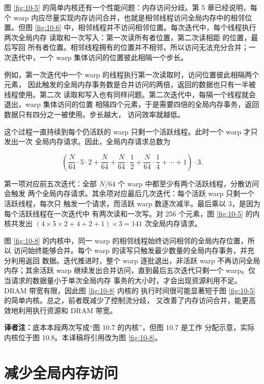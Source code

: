 图 \ref{fig:10-5} 的简单内核还有一个性能问题：内存访问分歧。第 5 章已经说明，每个
warp 内应尽量实现内存访问合并，也就是相邻线程访问全局内存中的相邻位置。但图
\ref{fig:10-6} 中，相邻线程并不访问相邻位置。每次迭代中，每个线程执行两次全局内存
读取和一次写入：第一次读所有者位置，第二次读相距  的位置，最后写回
所有者位置。相邻线程拥有的位置并不相邻，所以访问无法充分合并；一次迭代中，一个
warp 集体访问的位置彼此相隔一个步长。

例如，第一次迭代中一个 warp 的线程执行第一次读取时，访问位置彼此相隔两个元素，
因此触发的全局内存事务数是合并访问的两倍，返回的数据也只有一半被线程使用。第二次
读取和写入也有同样问题。第二次迭代中，每隔一个线程就会退出，warp 集体访问的位置
相隔四个元素，于是需要四倍的全局内存事务，返回数据只有四分之一被使用。步长越大，
访问效率就越低。

这个过程一直持续到每个仍活跃的 warp 只剩一个活跃线程。此时一个 warp 才只发出一次
全局内存请求。因此，全局内存请求总数为

\[
  \left(\frac{N}{64}\cdot5\cdot2+
  \frac{N}{64}+\frac{N}{64}\cdot\frac12+
  \frac{N}{64}\cdot\frac14+\cdots+1\right)\cdot3.
\]

第一项对应前五次迭代：全部 $N/64$ 个 warp 中都至少有两个活跃线程，分散访问会触发
两个全局内存请求。其余项对应最后几次迭代：每个活跃 warp 只剩一个活跃线程，每次只
触发一个请求，而活跃 warp 数逐次减半。最后乘以 3，是因为每个活跃线程在一次迭代中
有两次读和一次写。对 256 个元素，图 \ref{fig:10-5} 的内核共发出
$(4\times5\times2+4+2+1)\times3=141$ 次全局内存请求。

图 \ref{fig:10-8} 的内核中，同一 warp 的相邻线程始终访问相邻的全局内存位置，所以
访问始终能够合并。每个 warp 的读写只触发最少数量的全局内存事务，并充分利用返回
数据。迭代推进时，整个 warp 逐批退出，非活跃 warp 不再访问全局内存；其余活跃 warp
继续发出合并访问，直到最后五次迭代只剩一个 warp。仅当请求的数据量小于单次全局内存
事务的大小时，才会出现资源利用不足。DRAM 带宽有限，因此图 \ref{fig:10-8} 内核的
执行时间很可能显著短于图 \ref{fig:10-5} 的简单内核。总之，前者既减少了控制流分歧，
又改善了内存访问合并，能更高效地利用执行资源和 DRAM 带宽。

\noindent\textbf{译者注：}底本本段两次写成“图 10.7 的内核”，但图 10.7 是工作
分配示意，实际内核位于图 10.8。本译稿将引用改为图 \ref{fig:10-8}。

\section{减少全局内存访问}
\label{sec:reduction-global-accesses}

